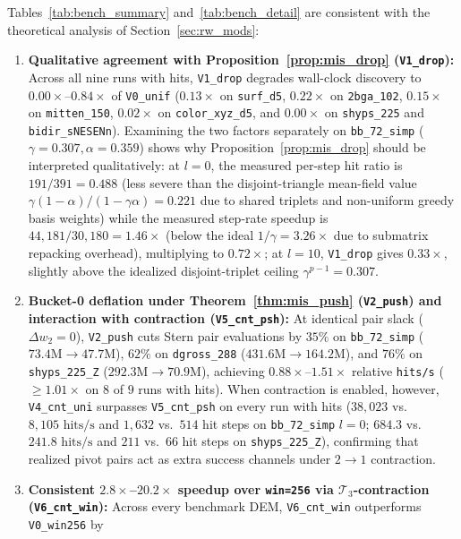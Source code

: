 \documentclass[12pt]{article}
\theoremstyle{definition}
\newcommand{\Tc}{\mathcal{T}_3}
\newcommand{\ttt}[1]{\texttt{#1}}
\begin{document}
Tables~\ref{tab:bench_summary} and~\ref{tab:bench_detail} are consistent with the theoretical analysis of
Section~\ref{sec:rw_mods}:
\begin{enumerate}[label=(\arabic*)]
  \item \textbf{Qualitative agreement with Proposition~\ref{prop:mis_drop} (\ttt{V1\_drop}):} Across all nine runs
    with hits, \ttt{V1\_drop} degrades wall-clock discovery to $0.00\times$--$0.84\times$ of \ttt{V0\_unif}
    ($0.13\times$ on \ttt{surf\_d5}, $0.22\times$ on \ttt{2bga\_102}, $0.15\times$ on \ttt{mitten\_150}, $0.02\times$
    on \ttt{color\_xyz\_d5}, and $0.00\times$ on \ttt{shyps\_225} and \ttt{bidir\_sNESENn}). Examining the two factors
    separately on \ttt{bb\_72\_simp} ($\gamma = 0.307, \alpha = 0.359$) shows why Proposition~\ref{prop:mis_drop}
    should be interpreted qualitatively: at $l = 0$, the measured per-step hit ratio is $191 / 391 = 0.488$ (less
    severe than the disjoint-triangle mean-field value $\gamma(1-\alpha)/(1-\gamma\alpha) = 0.221$ due to shared
    triplets and non-uniform greedy basis weights) while the measured step-rate speedup is $44{,}181 / 30{,}180 =
    1.46\times$ (below the ideal $1/\gamma = 3.26\times$ due to submatrix repacking overhead), multiplying to
    $0.72\times$; at $l = 10$, \ttt{V1\_drop} gives $0.33\times$, slightly above the idealized disjoint-triplet
    ceiling $\gamma^{p-1} = 0.307$.
  \item \textbf{Bucket-0 deflation under Theorem~\ref{thm:mis_push} (\ttt{V2\_push}) and interaction with
    contraction (\ttt{V5\_cnt\_psh}):} At identical pair slack ($\Delta w_2 = 0$), \ttt{V2\_push} cuts Stern pair
    evaluations by $35\%$ on \ttt{bb\_72\_simp} ($73.4\text{M} \to 47.7\text{M}$), $62\%$ on \ttt{dgross\_288}
    ($431.6\text{M} \to 164.2\text{M}$), and $76\%$ on \ttt{shyps\_225\_Z} ($292.3\text{M} \to 70.9\text{M}$),
    achieving $0.88\times$--$1.51\times$ relative \ttt{hits/s} ($\ge 1.01\times$ on $8$ of $9$ runs with hits).
    When contraction is enabled, however, \ttt{V4\_cnt\_uni} surpasses \ttt{V5\_cnt\_psh} on every run with hits
    ($38{,}023$ vs.\ $8{,}105\text{ hits/s}$ and $1{,}632$ vs.\ $514$ hit steps on \ttt{bb\_72\_simp} $l=0$; $684.3$
    vs.\ $241.8\text{ hits/s}$ and $211$ vs.\ $66$ hit steps on \ttt{shyps\_225\_Z}), confirming that realized pivot
    pairs act as extra success channels under $2 \to 1$ contraction.
  \item \textbf{Consistent $2.8\times$--$20.2\times$ speedup over \ttt{win=256} via $\Tc$-contraction
    (\ttt{V6\_cnt\_win}):} Across every benchmark DEM, \ttt{V6\_cnt\_win} outperforms \ttt{V0\_win256} by

\end{enumerate}
\end{document}
